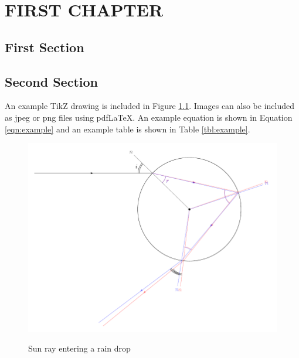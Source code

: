 %
%
%
%
%

\chapter{FIRST CHAPTER} %

\section{First Section}
\lipsum[2-3] %

\section{Second Section}
\lipsum[4] %

An example TikZ drawing is included in Figure \ref{fig:example}. Images can also be included as jpeg or png files using pdf\LaTeX. An example equation is shown in Equation \ref{eqn:example} and an example table is shown in Table \ref{tbl:example}.

\lipsum[5]

\begin{figure}
  \centering
  \includegraphics[width=\imsize]{figures/raindrop}\\
  \caption{Sun ray entering a rain drop}\label{fig:example}
\end{figure}

